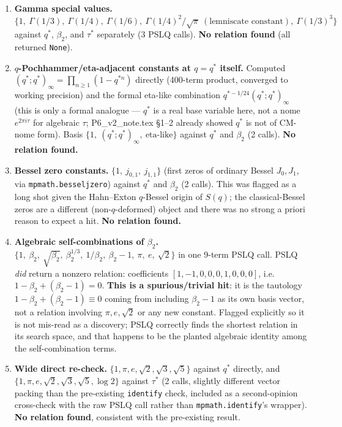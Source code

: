 \documentclass[11pt]{article}
\begin{document}
\begin{enumerate}
\item \textbf{Gamma special values.} $\{1,\ \Gamma(1/3),\ \Gamma(1/4),\ \Gamma(1/6),\
\Gamma(1/4)^2/\sqrt\pi\ (\text{lemniscate constant}),\ \Gamma(1/3)^3\}$ against $q^\ast$,
$\beta_2$, and $\tau^\ast$ separately (3 PSLQ calls). \textbf{No relation found} (all returned
\texttt{None}).
\item \textbf{$q$-Pochhammer/eta-adjacent constants at $q=q^\ast$ itself.} Computed
$(q^\ast;q^\ast)_\infty=\prod_{n\ge1}(1-q^{\ast n})$ directly (400-term product, converged to
working precision) and the formal eta-like combination $q^{\ast-1/24}(q^\ast;q^\ast)_\infty$
(this is only a formal analogue --- $q^\ast$ is a real base variable here, not a nome
$e^{2\pi i\tau}$ for algebraic $\tau$; P6\_v2\_note.tex \S1--2 already showed $q^\ast$ is not of
CM-nome form). Basis $\{1,\ (q^\ast;q^\ast)_\infty,\ \text{eta-like}\}$ against $q^\ast$ and
$\beta_2$ (2 calls). \textbf{No relation found.}
\item \textbf{Bessel zero constants.} $\{1,\ j_{0,1},\ j_{1,1}\}$ (first zeros of ordinary Bessel
$J_0,J_1$, via \texttt{mpmath.besseljzero}) against $q^\ast$ and $\beta_2$ (2 calls). This was
flagged as a long shot given the Hahn--Exton $q$-Bessel origin of $S(q)$; the classical-Bessel
zeros are a different (non-$q$-deformed) object and there was no strong a priori reason to expect
a hit. \textbf{No relation found.}
\item \textbf{Algebraic self-combinations of $\beta_2$.} $\{1,\ \beta_2,\ \sqrt{\beta_2},\
\beta_2^{1/3},\ 1/\beta_2,\ \beta_2-1,\ \pi,\ e,\ \sqrt2\}$ in one 9-term PSLQ call. PSLQ
\emph{did} return a nonzero relation: coefficients $[1,-1,0,0,0,1,0,0,0]$, i.e.
$1 - \beta_2 + (\beta_2-1) = 0$. \textbf{This is a spurious/trivial hit}: it is the tautology
$1-\beta_2+(\beta_2-1)\equiv0$ coming from including $\beta_2-1$ as its own basis vector, not a
relation involving $\pi,e,\sqrt2$ or any new constant. Flagged explicitly so it is not
mis-read as a discovery; PSLQ correctly finds the shortest relation in its search space, and
that happens to be the planted algebraic identity among the self-combination terms.
\item \textbf{Wide direct re-check.} $\{1,\pi,e,\sqrt2,\sqrt3,\sqrt5\}$ against $q^\ast$ directly,
and $\{1,\pi,e,\sqrt2,\sqrt3,\sqrt5,\log2\}$ against $\tau^\ast$ (2 calls, slightly different
vector packing than the pre-existing \texttt{identify} check, included as a second-opinion
cross-check with the raw PSLQ call rather than \texttt{mpmath.identify}'s wrapper).
\textbf{No relation found}, consistent with the pre-existing result.
\end{enumerate}
\end{document}
